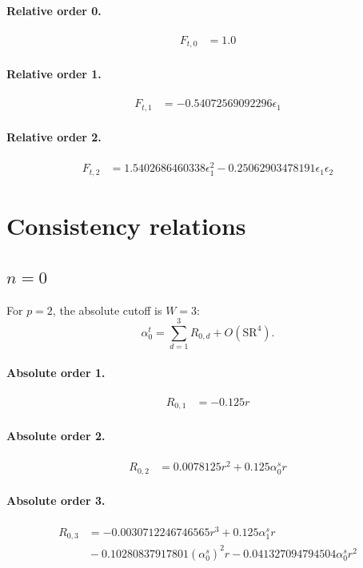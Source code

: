 \documentclass[10pt]{article}
\begin{document}
\paragraph{Relative order 0.}
\begin{align*}
F_{t,0} &= 1.0
\end{align*}

\paragraph{Relative order 1.}
\begin{align*}
F_{t,1} &=  - 0.54072569092296 \epsilon_{1}
\end{align*}

\paragraph{Relative order 2.}
\begin{align*}
F_{t,2} &= 1.5402686460338 \epsilon_{1}^{2} - 0.25062903478191 \epsilon_{1} \epsilon_{2}
\end{align*}

\section{Consistency relations}
\subsection{$n=0$}
For $p=2$, the absolute cutoff is $W=3$:
\[\alpha_{0}^t=\sum_{d=1}^{3}R_{0,d}+O(\mathrm{SR}^{4}).\]
\paragraph{Absolute order 1.}
\begin{align*}
R_{0,1} &=  - 0.125 r
\end{align*}

\paragraph{Absolute order 2.}
\begin{align*}
R_{0,2} &= 0.0078125 r^{2} + 0.125 \alpha_{0}^s r
\end{align*}

\paragraph{Absolute order 3.}
\begin{align*}
R_{0,3} &=  - 0.0030712246746565 r^{3} + 0.125 \alpha_{1}^s r \\
&{}  - 0.10280837917801 \left(\alpha_{0}^s\right)^{2} r - 0.041327094794504 \alpha_{0}^s r^{2}
\end{align*}
\end{document}
